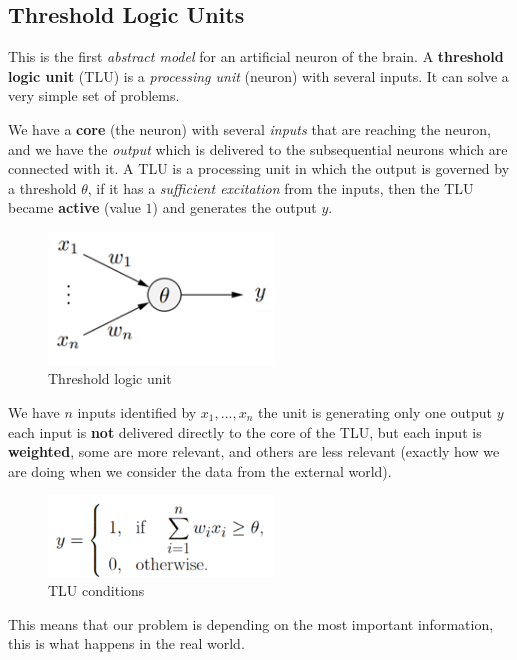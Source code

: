 \documentclass{article}
\begin{document}
\subsection{Threshold Logic Units}
This is the first \textit{abstract model} for an artificial neuron of the brain.
A \textbf{threshold logic unit} (TLU) is a \textit{processing unit} (neuron) with several inputs.
It can solve a very simple set of problems.

We have a \textbf{core} (the neuron) with several \textit{inputs} that are reaching the neuron, and we have the
\textit{output} which is delivered to the subsequential neurons which are connected with it.
A TLU is a processing unit in which the output is governed by a threshold $\theta$, if it has a \textit{sufficient excitation}
from the inputs, then the TLU became \textbf{active} (value $1$) and generates the output $y$.

\begin{figure}[H]
    \centering
    \includegraphics[width=6cm]{images/tlu.png}
    \caption{Threshold logic unit}
    \label{fig:tlu}
\end{figure}

We have $n$ inputs identified by $x_1,...,x_n$ the unit is generating only one output $y$ each input is \textbf{not}
delivered directly to the core of the TLU, but each input is \textbf{weighted}, some are more relevant,
and others are less relevant (exactly how we are doing when we consider the data from the external world).

\begin{figure}[H]
    \centering
    \includegraphics[width=6cm]{images/tlu_working_system.png}
    \caption{TLU conditions}
    \label{fig:tlu_conditions}
\end{figure}

This means that our problem is depending on the most important information, this is what happens in the real world.
\end{document}
